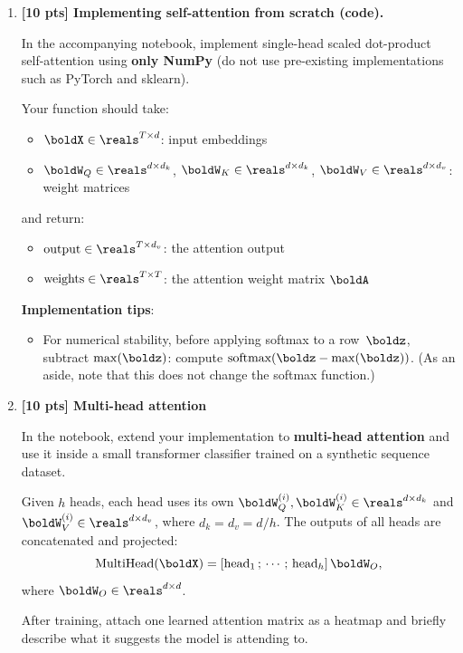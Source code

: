 \documentclass[submit]{../harvardml}
\begin{document}
\begin{problem}
\begin{enumerate}
\begin{enumerate}
  \item The standard fix is to add a \textbf{positional encoding}
  $\boldP\boldE \in \reals^{T \times d}$ to the input:
  $\boldX' = \boldX + \boldP\boldE$.
  Why does this break permutation equivariance?
\end{enumerate}

\item \textbf{[10 pts] Implementing self-attention from scratch (code).}

In the accompanying notebook, implement single-head scaled dot-product self-attention
using \textbf{only NumPy} (do not use pre-existing implementations such as PyTorch and sklearn).

Your function should take:
\begin{itemize}
  \item $\boldX \in \reals^{T \times d}$: input embeddings
  \item $\boldW_Q \in \reals^{d \times d_k}$, $\boldW_K \in \reals^{d \times d_k}$,
        $\boldW_V \in \reals^{d \times d_v}$: weight matrices
\end{itemize}
and return:
\begin{itemize}
  \item $\text{output} \in \reals^{T \times d_v}$: the attention output
  \item $\text{weights} \in \reals^{T \times T}$: the attention weight matrix $\boldA$
\end{itemize}

\textbf{Implementation tips}:
\begin{itemize}
  \item For numerical stability, before applying softmax to a row~$\boldz$, subtract
  $\max(\boldz)$: compute $\text{softmax}(\boldz - \max(\boldz))$. (As an aside, note that this does not change the softmax function.)
\end{itemize}

\item \textbf{[10 pts] Multi-head attention}

In the notebook, extend your implementation to \textbf{multi-head attention}
and use it inside a small transformer classifier trained on a synthetic
sequence dataset.

Given $h$ heads, each head
  uses its own $\boldW_Q^{(i)}, \boldW_K^{(i)} \in \reals^{d \times d_k}$ and
  $\boldW_V^{(i)} \in \reals^{d \times d_v}$, where $d_k = d_v = d / h$.
  The outputs of all heads are concatenated and projected:
  \[
    \text{MultiHead}(\boldX) = [\text{head}_1 \,;\, \cdots \,;\, \text{head}_h]\,
    \boldW_O,
  \]
  where $\boldW_O \in \reals^{d \times d}$.

After training, attach one learned attention matrix as a heatmap and
briefly describe what it suggests the model is attending to.


\end{enumerate}

\end{problem}
\end{document}
